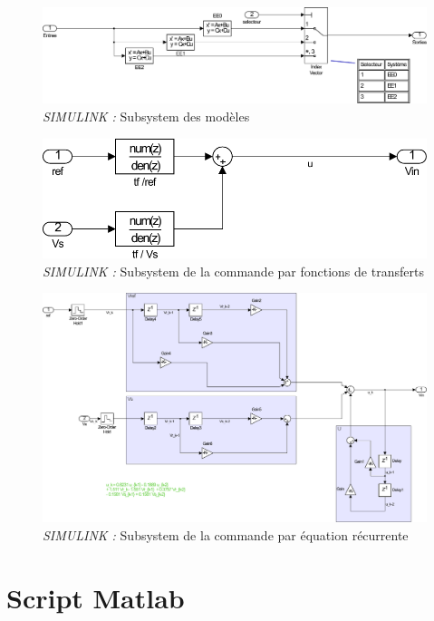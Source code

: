 \begin{figure}[!ht]
	\centering
	\includegraphics[width = \textwidth]{./annexes/annexe4/Commande_TD_modele.pdf}
	\caption{\emph{SIMULINK :} Subsystem des modèles}
\end{figure}

\begin{figure}[!ht]
	\centering
	\includegraphics[width = .6\textwidth]{./annexes/annexe4/Commande_TD_comFT.pdf}
	\caption{\emph{SIMULINK :} Subsystem de la commande par fonctions de transferts}
\end{figure}

\begin{figure}[!ht]
	\centering
	\includegraphics[width = \textwidth]{./annexes/annexe4/Commande_TD_comER.pdf}
	\caption{\emph{SIMULINK :} Subsystem de la commande par équation récurrente}
\end{figure}
\section*{Script Matlab}
\lstset{caption=Script d'affichage}
